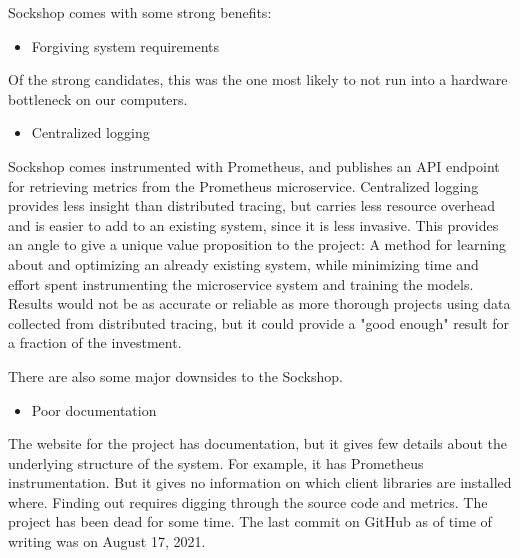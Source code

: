 Sockshop comes with some strong benefits:

\begin{itemize}
    \item Forgiving system requirements
\end{itemize}

Of the strong candidates, this was the one most likely to not run into a hardware bottleneck on our computers. 

\begin{itemize}
    \item Centralized logging
\end{itemize}
Sockshop comes instrumented with Prometheus, and publishes an API endpoint for retrieving metrics from the Prometheus microservice. Centralized logging provides less insight than distributed tracing, but carries less resource overhead and is easier to add to an existing system, since it is less invasive. 
This provides an angle to give a unique value proposition to the project: A method for learning about and optimizing an already existing system, while minimizing time and effort spent instrumenting the microservice system and training the models. Results would not be as accurate or reliable as more thorough projects using data collected from distributed tracing, but it could provide a "good enough" result for a fraction of the investment.

There are also some major downsides to the Sockshop.

\begin{itemize}
    \item Poor documentation
\end{itemize}
The website for the project \cite*{Weaveworks} has documentation, but it gives few details about the underlying structure of the system. 
For example, it has Prometheus instrumentation. But it gives no information on which client libraries are installed where. Finding out requires digging through the source code and metrics.
The project has been dead for some time. The last commit on GitHub as of time of writing was on August 17, 2021. 